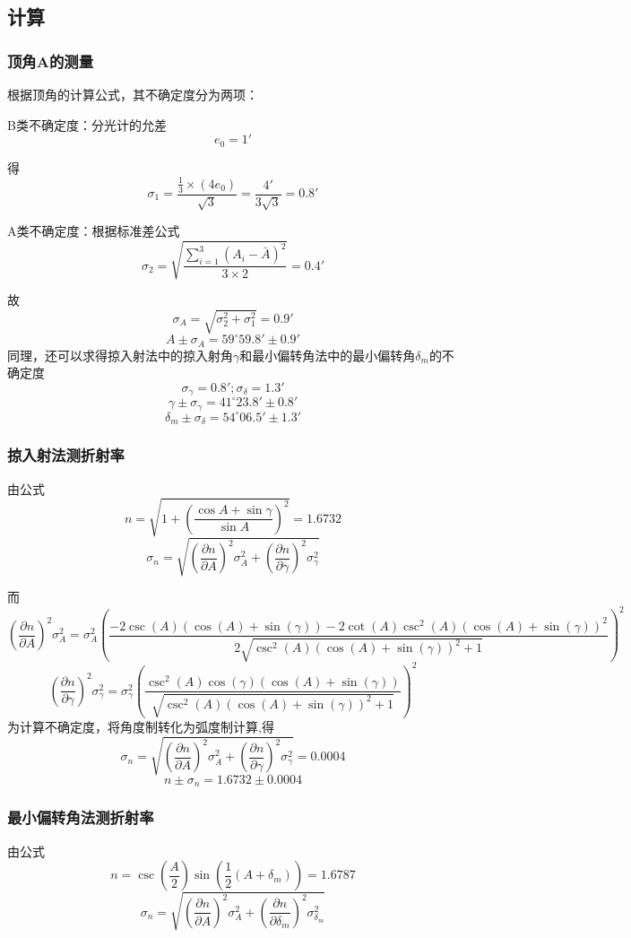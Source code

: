 \documentclass{ctexart}
\begin{document}
  \subsection{计算}
  \subsubsection{顶角A的测量}
  根据顶角的计算公式，其不确定度分为两项：

  B类不确定度：分光计的允差$$e_0={1'}$$
  
  得$$\sigma_1=\frac{\frac{1}{3}\times(4e_0)}{\sqrt{3}}=\frac{4'}{3\sqrt{3}}=0.8'$$
  
  A类不确定度：根据标准差公式$$\sigma_2=\sqrt{\frac{\sum\limits_{i=1}^{3}{(A_i-\bar{A})^2}}{3\times2}}=0.4'$$

  故$$\sigma_A=\sqrt{\sigma_2^2+\sigma_1^2}=0.9'$$
  $$A\pm \sigma_A=59^\circ59.8'\pm0.9'$$
  同理，还可以求得掠入射法中的掠入射角$\gamma$和最小偏转角法中的最小偏转角$\delta_m$的不确定度
  $$\sigma_{\gamma}=0.8';\sigma_{\delta}=1.3'$$
  $$\gamma\pm\sigma_{\gamma}=41^\circ23.8'\pm 0.8'$$
  $$\delta_{m}\pm\sigma_{\delta}=54^\circ06.5'\pm 1.3'$$
  \subsubsection{掠入射法测折射率}
  由公式$$n=\sqrt{1+(\frac{\cos{A}+\sin{\gamma}}{\sin{A}})^2}=1.6732$$
  $$\sigma_n=\sqrt{(\frac{\partial n}{\partial A})^2\sigma_A^2+(\frac{\partial n}{\partial \gamma})^2\sigma_{\gamma}^2}$$
  
  而$$(\frac{\partial n}{\partial A})^2\sigma_A^2=\sigma_A^2(\frac{-2 \csc (A) (\cos (A)+\sin (\gamma ))-2 \cot (A) \csc ^2(A) (\cos (A)+\sin (\gamma ))^2}{2 \sqrt{\csc ^2(A) (\cos (A)+\sin (\gamma ))^2+1}})^2$$
  $$(\frac{\partial n}{\partial \gamma})^2\sigma_{\gamma}^2=\sigma_{\gamma}^2(\frac{\csc ^2(A) \cos (\gamma ) (\cos (A)+\sin (\gamma ))}{\sqrt{\csc ^2(A) (\cos (A)+\sin (\gamma ))^2+1}})^2$$
  为计算不确定度，将角度制转化为弧度制计算,得$$\sigma_n=\sqrt{(\frac{\partial n}{\partial A})^2\sigma_A^2+(\frac{\partial n}{\partial \gamma})^2\sigma_{\gamma}^2}=0.0004$$
  $$n\pm \sigma_n=1.6732\pm 0.0004$$
  \subsubsection{最小偏转角法测折射率}
  由公式$$n=\csc \left(\frac{A}{2}\right) \sin \left(\frac{1}{2} \left(A+\delta _m\right)\right)=1.6787$$
  $$\sigma_n=\sqrt{(\frac{\partial n}{\partial A})^2\sigma_A^2+(\frac{\partial n}{\partial \delta_m})^2\sigma_{\delta_m}^2}$$
  
\end{document}
